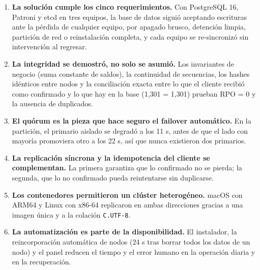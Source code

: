 \documentclass[11pt,a4paper]{article}
\newcommand{\cod}[1]{\texttt{#1}}
\begin{document}
\begin{enumerate}
  \item \textbf{La solución cumple los cinco requerimientos.} Con PostgreSQL 16, Patroni y etcd en tres equipos, la base de datos siguió aceptando escrituras ante la pérdida de cualquier equipo, por apagado brusco, detención limpia, partición de red o reinstalación completa, y cada equipo se re-sincronizó sin intervención al regresar.
  \item \textbf{La integridad se demostró, no solo se asumió.} Los invariantes de negocio (suma constante de saldos), la continuidad de secuencias, los hashes idénticos entre nodos y la conciliación exacta entre lo que el cliente recibió como confirmado y lo que hay en la base (1,301 = 1,301) prueban RPO = 0 y la ausencia de duplicados.
  \item \textbf{El quórum es la pieza que hace seguro el failover automático.} En la partición, el primario aislado se degradó a los 11 s, antes de que el lado con mayoría promoviera otro a los 22 s, así que nunca existieron dos primarios.
  \item \textbf{La replicación síncrona y la idempotencia del cliente se complementan.} La primera garantiza que lo confirmado no se pierda; la segunda, que lo no confirmado pueda reintentarse sin duplicarse.
  \item \textbf{Los contenedores permitieron un clúster heterogéneo.} macOS con ARM64 y Linux con x86-64 replicaron en ambas direcciones gracias a una imagen única y a la colación \cod{C.UTF-8}.
  \item \textbf{La automatización es parte de la disponibilidad.} El instalador, la reincorporación automática de nodos (24 s tras borrar todos los datos de un nodo) y el panel reducen el tiempo y el error humano en la operación diaria y en la recuperación.
\end{enumerate}
\end{document}
